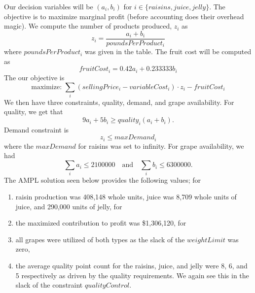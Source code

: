 \documentclass[11pt]{article}
\begin{document}
\begin{enumerate}
\begin{enumerate}
Our decision variables will be $(a_i,b_i)$ for $i\in\{raisins, juice, jelly\}$.  The objective is to maximize marginal profit (before accounting does their overhead magic).  We compute the number of products produced, $z_i$ as
\[
z_i = \frac{a_i+b_i}{poundsPerProduct_i}
\]
where $poundsPerProduct_i$ was given in the table.  The fruit cost will be computed as 
\[
fruitCost_i = 0.42a_i+0.233333b_i
\]
The our objective is
\[
\text{maximize: }\sum_{i}\left(sellingPrice_i-variableCost_i\right)\cdot z_i - fruitCost_i 
\]
We then have three constraints, quality, demand, and grape availability.  For quality, we get that
\[
9a_i+5b_i \geq quality_i(a_i+b_i).
\]
Demand constraint is
\[
z_i \leq maxDemand_i
\]
where the $maxDemand$ for raisins was set to infinity.  For grape availability, we had
\[
\sum_i a_i \leq 2 100 000\quad\text{and}\quad\sum_ib_i \leq 6 300 000.
\]
The AMPL solution seen below provides the following values; for 
\begin{enumerate}
\item raisin production was 408,148 whole units, juice was 8,709 whole units of juice, and 290,000 units of jelly, for 
\item the maximized contribution to profit was \$1,306,120, for 
\item all grapes were utilized of both types as the slack of the $weightLimit$ was zero, 
\item the average quality point count for the raisins, juice, and jelly were 8, 6, and 5 respectively as driven by the quality requirements.\label{1c}  We again see this in the slack of the constraint $qualityControl$.
\end{enumerate}


\end{enumerate}
\end{enumerate}
\end{document}
